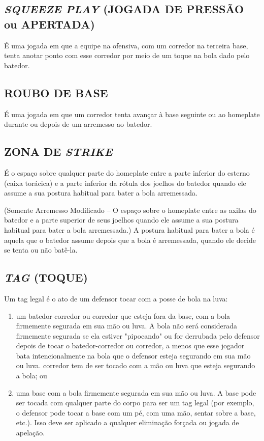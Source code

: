 \subsection{\textit{SQUEEZE PLAY} (JOGADA DE PRESSÃO ou APERTADA)}

 É uma jogada em que a equipe na ofensiva, com um corredor na terceira base, tenta anotar ponto com esse corredor por meio de um toque na bola dado pelo batedor.

\subsection{ROUBO DE BASE}

 É uma jogada em que um corredor tenta avançar à base seguinte ou ao \gls{homeplate} durante ou depois de um arremesso ao batedor.

\subsection{ZONA DE \textit{STRIKE}}

 É o espaço sobre qualquer parte do \gls{homeplate} entre a parte inferior do esterno (caixa torácica) e a parte inferior da rótula dos joelhos do batedor quando ele  assume a sua postura habitual para bater a bola arremessada.

 (Somente Arremesso Modificado -- O espaço sobre o \gls{homeplate} entre as axilas do batedor e a parte superior de seus joelhos quando ele assume a sua postura habitual para bater a bola arremessada.) A postura habitual para bater a bola é aquela que o batedor assume depois que a bola é arremessada, quando ele decide se tenta ou não batê-la.

\subsection{\textit{TAG} (TOQUE)}

 Um \gls{tag} legal é o ato de um defensor tocar com a posse de bola na luva:

\begin{enumerate}[label=(\alph*)]
	\item   um batedor-corredor ou corredor que esteja fora da base, com a bola firmemente segurada em sua mão ou luva. A bola não será considerada firmemente segurada se ela estiver "pipocando" ou for derrubada pelo defensor  depois de tocar o batedor-corredor ou corredor, a menos que esse jogador bata intencionalmente na bola que o defensor esteja segurando em sua mão ou luva. corredor tem de ser tocado com a mão ou luva que esteja segurando a bola; ou
	\item  uma base com a bola firmemente segurada em sua mão ou luva. A base pode ser tocada com qualquer parte do corpo para ser um \gls{tag} legal (por exemplo, o defensor pode tocar a base com um pé, com uma mão, sentar sobre a base,  etc.). Isso deve ser aplicado a qualquer eliminação forçada ou jogada de apelação.
\end{enumerate}

